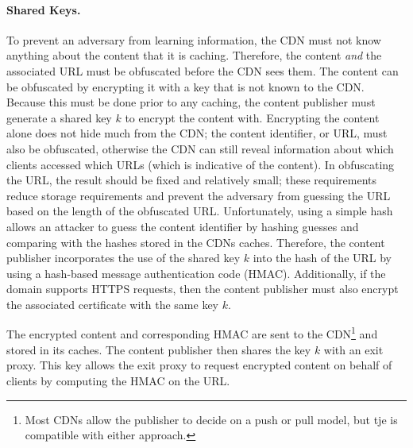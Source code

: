 \paragraph{Shared Keys.} 
To prevent an adversary from learning information, the CDN must not know anything
about the
content that it is caching.  Therefore, the content {\it and} the associated URL
must be obfuscated
before the CDN sees them.  The content can be obfuscated by encrypting it with a
key that is not
known to the CDN.  Because this must be done prior to any caching, the content publisher must 
generate a shared key $k$ to encrypt the content with. Encrypting the content alone does not 
hide much from the CDN; the content identifier, or URL, must also be obfuscated, otherwise the 
CDN can still reveal information about which clients accessed which URLs (which is indicative 
of the content).  In obfuscating the URL, the result should be fixed and relatively
small; 
these requirements reduce storage requirements and prevent the adversary from guessing
the
URL based on the length of the obfuscated URL.  Unfortunately, using a simple hash allows an 
attacker to guess the content identifier by hashing guesses and comparing with 
the hashes stored in the CDNs caches.  Therefore, the content publisher incorporates the use 
of the shared key $k$ into the hash of the URL by using a hash-based message authentication code 
(HMAC).  Additionally, if the domain supports HTTPS requests, then the content publisher must 
also encrypt the associated certificate with the same key $k$.

The encrypted content and corresponding HMAC are sent to the CDN\footnote{Most CDNs
allow the publisher to
decide on a push or pull model, but tje \system{} is compatible with either approach.}
and stored in
its caches.  The content publisher then shares the key $k$ with an exit proxy. 
This key allows the 
exit proxy to request encrypted content on behalf of clients by computing the HMAC on the URL.  

